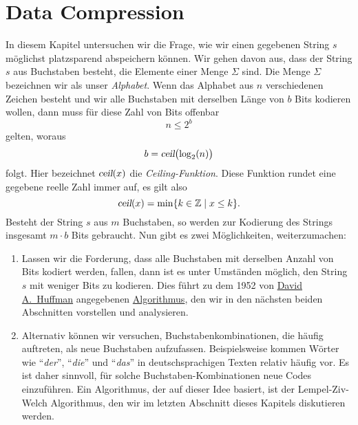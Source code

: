 \chapter{Data Compression}
In diesem Kapitel untersuchen wir die Frage, wie wir einen gegebenen String $s$ m\"oglichst platzsparend
abspeichern k\"onnen.  Wir gehen davon aus, dass der String $s$ aus Buchstaben besteht, die 
Elemente einer Menge $\Sigma$ sind.  Die Menge $\Sigma$ bezeichnen wir als unser \emph{Alphabet}. 
Wenn das Alphabet aus $n$ verschiedenen Zeichen besteht und wir alle Buchstaben mit derselben L\"ange
von $b$ Bits kodieren wollen, dann muss f\"ur diese Zahl von Bits offenbar
\[ n \leq 2^b \] 
gelten, woraus
\[ b = \textsl{ceil}\bigl(\log_2(n)\bigr) \]
folgt.  Hier bezeichnet $\textsl{ceil}(x)$ die \emph{Ceiling-Funktion}.  Diese Funktion
rundet eine gegebene reelle Zahl immer auf, es gilt also
\[ \textsl{ceil}(x) = \min \{ k \in \mathbb{Z} \mid x \leq k \}. \]
Besteht der String $s$ aus $m$ Buchstaben, so werden zur Kodierung des Strings insgesamt
$m \cdot b$ Bits gebraucht.  Nun gibt es zwei M\"oglichkeiten, weiterzumachen:
\begin{enumerate}
\item Lassen wir die Forderung, dass alle Buchstaben mit derselben Anzahl von Bits kodiert werden,
      fallen, dann ist es unter Umst\"anden m\"oglich, den String $s$ mit weniger Bits zu kodieren.  
      Dies f\"uhrt zu dem 1952 von \href{https://en.wikipedia.org/wiki/David_A._Huffman}{David A.~Huffman} 
      angegebenen \href{https://en.wikipedia.org/wiki/Huffman_coding}{Algorithmus}, den wir in den n\"achsten 
      beiden Abschnitten vorstellen und analysieren.
\item Alternativ k\"onnen wir versuchen, Buchstabenkombinationen, die h\"aufig auftreten, als neue
      Buchstaben aufzufassen.  Beispielsweise kommen W\"orter wie ``\emph{der}'', ``\emph{die}'' und
      ``\emph{das}'' in deutschsprachigen Texten relativ h\"aufig vor.  Es ist daher sinnvoll, f\"ur
      solche Buchstaben-Kombinationen neue Codes einzuf\"uhren.  Ein Algorithmus, der auf dieser Idee
      basiert, ist der Lempel-Ziv-Welch Algorithmus, den wir im letzten Abschnitt dieses Kapitels 
      diskutieren werden.
\end{enumerate}


